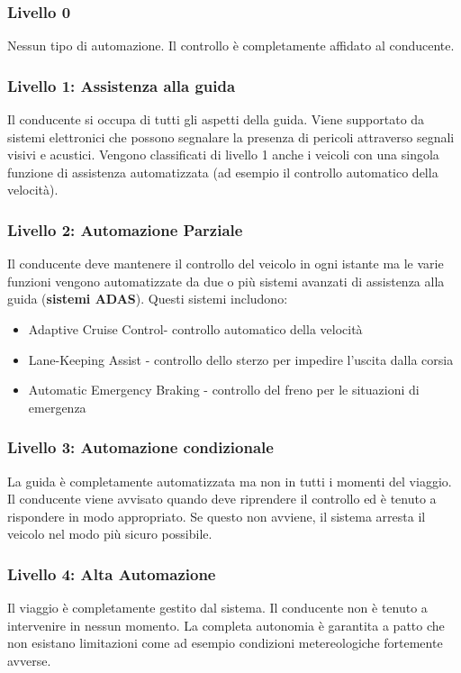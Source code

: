 \subsubsection{Livello 0}
Nessun tipo di automazione. Il controllo è completamente affidato al conducente.
\subsubsection{Livello 1: Assistenza alla guida}
Il conducente si occupa di tutti gli aspetti della guida. Viene supportato da sistemi elettronici che possono  segnalare la presenza di pericoli attraverso segnali visivi e acustici.
Vengono classificati di livello 1 anche i veicoli con una singola funzione di assistenza automatizzata (ad esempio il controllo automatico della velocità).
\subsubsection{Livello 2: Automazione Parziale}
Il conducente deve mantenere il controllo del veicolo in ogni istante ma le  varie funzioni vengono automatizzate da 
due o più sistemi avanzati di assistenza alla guida (\textbf{sistemi ADAS}). Questi sistemi includono:
\begin{itemize}
    \item Adaptive Cruise Control- controllo automatico della velocità
    \item Lane-Keeping Assist - controllo dello sterzo per impedire l'uscita dalla corsia
    \item Automatic Emergency Braking -  controllo del freno per le situazioni di emergenza
\end{itemize}
\subsubsection{Livello 3: Automazione condizionale}
La guida è completamente automatizzata ma non in tutti i momenti del viaggio. Il conducente viene avvisato quando deve riprendere il controllo ed è tenuto a rispondere
in modo appropriato. Se questo non avviene, il sistema arresta il veicolo nel modo più sicuro possibile.
\subsubsection{Livello 4: Alta Automazione}
Il viaggio è completamente gestito dal sistema. Il conducente non è tenuto a intervenire in nessun momento. La completa autonomia è garantita a patto che non esistano limitazioni come ad esempio condizioni
metereologiche fortemente avverse.
